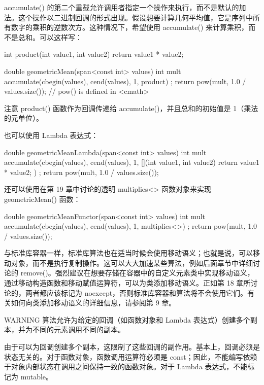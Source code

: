 accumulate() 的第二个重载允许调用者指定一个操作来执行，而不是默认的加法。这个操作以二进制回调的形式出现。假设想要计算几何平均值，它是序列中所有数字的乘积的逆数次方。这种情况下，希望使用 accumulate() 来计算乘积，而不是总和。可以这样写：

\begin{cpp}
int product(int value1, int value2) { return value1 * value2; }

double geometricMean(span<const int> values)
{
    int mult { accumulate(cbegin(values), cend(values), 1, product) };
    return pow(mult, 1.0 / values.size()); // pow() is defined in <cmath>
}
\end{cpp}

注意 product() 函数作为回调传递给 accumulate()，并且总和的初始值是 1（乘法的元单位）。

也可以使用 Lambda 表达式：

\begin{cpp}
double geometricMeanLambda(span<const int> values)
{
    int mult { accumulate(cbegin(values), cend(values), 1,
        [](int value1, int value2) { return value1 * value2; }) };
    return pow(mult, 1.0 / values.size());
}
\end{cpp}

还可以使用在第 19 章中讨论的透明 multiplies<> 函数对象来实现 geometricMean() 函数：

\begin{cpp}
double geometricMeanFunctor(span<const int> values)
{
    int mult { accumulate(cbegin(values), cend(values), 1, multiplies<>{}) };
    return pow(mult, 1.0 / values.size());
}
\end{cpp}


与标准库容器一样，标准库算法也在适当时候会使用移动语义；也就是说，可以移动对象，而不是执行复制操作。这可以大大加速某些算法，例如后面章节中详细讨论的 remove()。强烈建议在想要存储在容器中的自定义元素类中实现移动语义，通过移动构造函数和移动赋值运算符，可以为类添加移动语义。正如第 18 章所讨论的，两者都应该标记为 noexcept，否则标准库容器和算法将不会使用它们。有关如何向类添加移动语义的详细信息，请参阅第 9 章。


\begin{myWarning}{WARNING}
算法允许为给定的回调（如函数对象和 Lambda 表达式）创建多个副本，并为不同的元素调用不同的副本。
\end{myWarning}

由于可以为回调创建多个副本，这限制了这些回调的副作用。基本上，回调必须是状态无关的。对于函数对象，函数调用运算符必须是 const；因此，不能编写依赖于对象内部状态在调用之间保持一致的函数对象。对于 Lambda 表达式，不能标记为 mutable。

